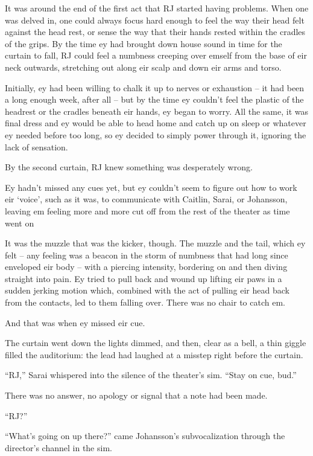 It was around the end of the first act that RJ started having problems.  When one was delved in, one could always focus hard enough to feel the way their head felt against the head rest, or sense the way that their hands rested within the cradles of the grips.  By the time ey had brought down house sound in time for the curtain to fall, RJ could feel a numbness creeping over emself from the base of eir neck outwards, stretching out along eir scalp and down eir arms and torso.

Initially, ey had been willing to chalk it up to nerves or exhaustion -- it had been a long enough week, after all -- but by the time ey couldn't feel the plastic of the headrest or the cradles beneath eir hands, ey began to worry.  All the same, it was final dress and ey would be able to head home and catch up on sleep or whatever ey needed before too long, so ey decided to simply power through it, ignoring the lack of sensation.

By the second curtain, RJ knew something was desperately wrong.

Ey hadn't missed any cues yet, but ey couldn't seem to figure out how to work eir `voice', such as it was, to communicate with Caitlin, Sarai, or Johansson, leaving em feeling more and more cut off from the rest of the theater as time went on

It was the muzzle that was the kicker, though.  The muzzle and the tail, which ey felt -- any feeling was a beacon in the storm of numbness that had long since enveloped eir body -- with a piercing intensity, bordering on and then diving straight into pain.  Ey tried to pull back and wound up lifting eir paws in a sudden jerking motion which, combined with the act of pulling eir head back from the contacts, led to them falling over.  There was no chair to catch em.

And that was when ey missed eir cue.

\secdiv

The curtain went down the lights dimmed, and then, clear as a bell, a thin giggle filled the auditorium: the lead had laughed at a misstep right before the curtain.

``RJ,'' Sarai whispered into the silence of the theater's sim.  ``Stay on cue, bud.''

There was no answer, no apology or signal that a note had been made.

``RJ?''

``What's going on up there?'' came Johansson's subvocalization through the director's channel in the sim.

